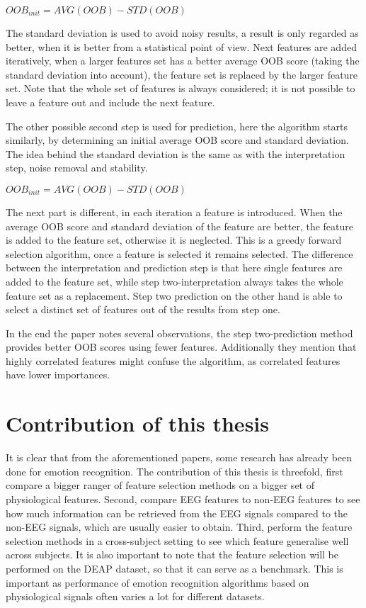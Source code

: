 \begin{center}
$OOB_{init} = AVG(OOB) - STD(OOB)$
\end{center}

The standard deviation is used to avoid noisy results, a result is only regarded as better, when it is better from a statistical point of view. Next features are added iteratively, when a larger features set has a better average OOB score (taking the standard deviation into account), the feature set is replaced by the larger feature set. Note that the whole set of features is always considered; it is not possible to leave a feature out and include the next feature.

\npar

The other possible second step is used for prediction, here the algorithm starts similarly, by determining an initial average OOB score and standard deviation. The idea behind the standard deviation is the same as with the interpretation step, noise removal and stability.

\begin{center}
$OOB_{init} = AVG(OOB) - STD(OOB)$
\end{center}

The next part is different, in each iteration a feature is introduced. When the average OOB score and standard deviation of the feature are better, the feature is added to the feature set, otherwise it is neglected. This is a greedy forward selection algorithm, once a feature is selected it remains selected. The difference between the interpretation and prediction step is that here single features are added to the feature set, while step two-interpretation always takes the whole feature set as a replacement.  Step two prediction on the other hand is able to select a distinct set of features out of the results from step one.

\npar

In the end the paper notes several observations, the step two-prediction method provides better OOB scores using fewer features. Additionally they mention that highly correlated features might confuse the algorithm, as correlated features have lower importances.

\section{Contribution of this thesis}

It is clear that from the aforementioned papers, some research has already been done for emotion recognition. The contribution of this thesis is threefold, first compare a bigger ranger of feature selection methods on a bigger set of physiological features. Second, compare EEG features to non-EEG features to see how much information can be retrieved from the EEG signals compared to the non-EEG signals, which are usually easier to obtain. Third, perform the feature selection methods in a cross-subject setting to see which feature generalise well across subjects. It is also important to note that the feature selection will be performed on the DEAP dataset, so that it can serve as a benchmark. This is important as performance of emotion recognition algorithms based on physiological signals often varies a lot for different datasets\citep{PhytoEm}.


